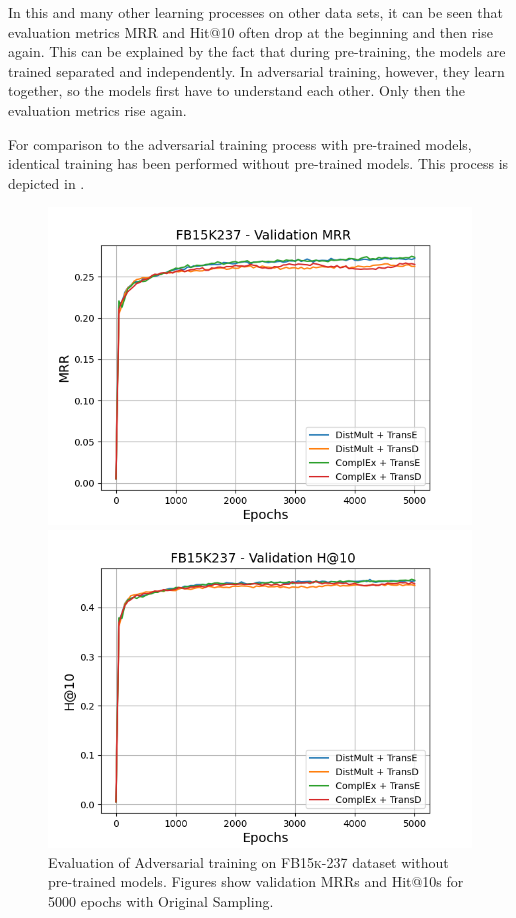 In this and many other learning processes on other data sets, it can be seen that evaluation metrics MRR and Hit@10 often drop at the beginning and then rise again.
This can be explained by the fact that during pre-training, the models are trained separated and independently.
In adversarial training, however, they learn together, so the models first have to understand each other.
Only then the evaluation metrics rise again.

For comparison to the adversarial training process with pre-trained models, identical training has been performed without pre-trained models.
This process is depicted in .
\begin{figure}
    \centering
    \begin{minipage}{.5\textwidth}
      \centering
      \includegraphics[width=0.9\linewidth]{figures/results/gan_train/not_pretrained/random/fb15k237/epochs5000/random_fb15k237_mrrs.png}
    \end{minipage}%
    \begin{minipage}{.5\textwidth}
      \centering
      \includegraphics[width=0.9\linewidth]{figures/results/gan_train/not_pretrained/random/fb15k237/epochs5000/random_fb15k237_hit10.png}
    \end{minipage}
    \caption{Evaluation of Adversarial training on \textsc{FB15k-237} dataset without pre-trained models.
    Figures show validation MRRs and Hit@10s for 5000 epochs with Original Sampling.}
    \label{fig:original_not_pretrained_advtrain}
\end{figure}
